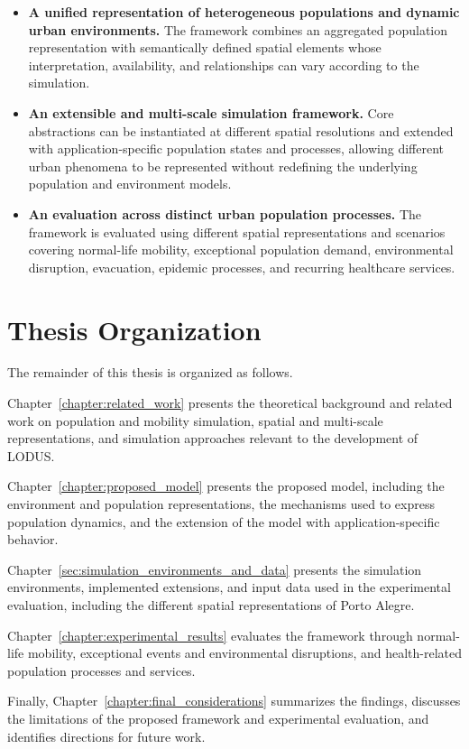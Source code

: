 \begin{itemize}
    \item \textbf{A unified representation of heterogeneous populations and dynamic urban environments.}
    The framework combines an aggregated population representation with semantically defined spatial elements whose interpretation, availability, and relationships can vary according to the simulation.

    \item \textbf{An extensible and multi-scale simulation framework.}
    Core abstractions can be instantiated at different spatial resolutions and extended with application-specific population states and processes, allowing different urban phenomena to be represented without redefining the underlying population and environment models.

    \item \textbf{An evaluation across distinct urban population processes.}
    The framework is evaluated using different spatial representations and scenarios covering normal-life mobility, exceptional population demand, environmental disruption, evacuation, epidemic processes, and recurring healthcare services.
\end{itemize}


\section{Thesis Organization}
\label{sec:introduction_organization}

The remainder of this thesis is organized as follows.

Chapter~\ref{chapter:related_work} presents the theoretical background and related work on population and mobility simulation, spatial and multi-scale representations, and simulation approaches relevant to the development of LODUS.

Chapter~\ref{chapter:proposed_model} presents the proposed model, including the environment and population representations, the mechanisms used to express population dynamics, and the extension of the model with application-specific behavior.

Chapter~\ref{sec:simulation_environments_and_data} presents the simulation environments, implemented extensions, and input data used in the experimental evaluation, including the different spatial representations of Porto Alegre.

Chapter~\ref{chapter:experimental_results} evaluates the framework through normal-life mobility, exceptional events and environmental disruptions, and health-related population processes and services.

Finally, Chapter~\ref{chapter:final_considerations} summarizes the findings, discusses the limitations of the proposed framework and experimental evaluation, and identifies directions for future work.